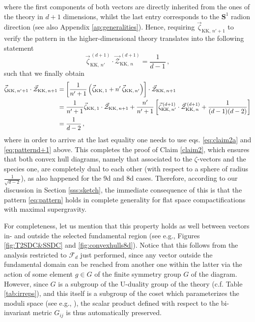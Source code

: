 %
where the first components of both vectors are directly inherited from the ones of the theory in $d+1$ dimensions, whilst the last entry corresponds to the $\mathbf{S}^1$ radion direction (see also Appendix \ref{ap:generalities}). Hence, requiring $\vec{\zeta}_{\text{KK},\, n'+1}$ to verify the pattern in the higher-dimensional theory translates into the following statement
%
\begin{equation}\label{eq:patternd+1}
	\vec{\zeta}^{\,(d+1)}_{\text{KK},\, n'} \cdot \vec{\mathcal{Z}}^{\,(d+1)}_{\text{KK},\, n} = \frac{1}{d-1}\, ,
\end{equation}
%
such that we finally obtain
%
\begin{align}
	\vec{\zeta}_{\text{KK},\, n'+1} \cdot \vec{\mathcal{Z}}_{\text{KK},\, n+1} &= \left[\frac{1}{n'+1} \left( \vec{\zeta}_{\text{KK},\, 1} + n'\, \vec{\zeta}_{\text{KK},\, n'} \right) \right] \cdot \vec{\mathcal{Z}}_{\text{KK},\, n+1} \notag\\
	& = \frac{1}{n'+1} \vec{\zeta}_{\text{KK},\, 1} \cdot \vec{\mathcal{Z}}_{\text{KK},\, n+1} + \frac{n'}{n'+1} \left[ \vec{\zeta}^{\,(d+1)}_{\text{KK},\, n'} \cdot \vec{\mathcal{Z}}^{\,(d+1)}_{\text{KK},\, n} + \frac{1}{(d-1)(d-2)}\right] \notag\\
	&=\frac{1}{d-2}\, ,
\end{align}
%
where in order to arrive at the last equality one needs to use eqs. \eqref{eq:claim2a} and \eqref{eq:patternd+1} above. This completes the proof of Claim \ref{claim2}, which ensures that both convex hull diagrams, namely that associated to the $\zeta$-vectors and the species one, are completely dual to each other (with respect to a sphere of radius $\frac{1}{\sqrt{d-2}}$), as also happened for the 9d and 8d cases. Therefore, according to our discussion in Section \ref{sss:sketch}, the immediate consequence of this is that the pattern \eqref{eq:pattern} holds in complete generality for flat space compactifications with maximal supergravity.

For completeness, let us mention that this property holds as well between vectors in- and outside the selected fundamental region (see e.g., Figures \ref{fig:T2SDC&SSDC} and \ref{fig:convexhulls8d}). Notice that this follows from the analysis restricted to $\mathscr{F}_d$ just performed, since any vector outside the fundamental domain can be reached from another one within the latter via the action of some element $g\in G$ of the finite symmetry group $G$ of the diagram. However, since $G$ is a subgroup of the U-duality group of the theory (c.f. Table \ref{tab:irreps}), and this itself is a subgroup of the coset which parameterizes the moduli space (see e.g., \cite{Cecotti:2015wqa}), the scalar product defined with respect to the bi-invariant metric $G_{i j}$ is thus automatically preserved.

